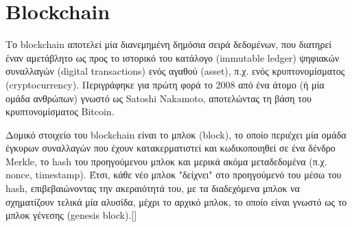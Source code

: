 \section{Blockchain}

Το blockchain αποτελεί μία διανεμημένη δημόσια σειρά δεδομένων, που διατηρεί έναν αμετάβλητο ως προς το ιστορικό του κατάλογο (immutable ledger) ψηφιακών συναλλαγών (digital transactions) ενός αγαθού (asset), π.χ. ενός κρυπτονομίσματος (cryptocurrency). Περιγράφηκε για πρώτη φορά το 2008 από ένα άτομο (ή μία ομάδα ανθρώπων) γνωστό ως Satoshi Nakamoto, αποτελώντας τη βάση του κρυπτονομίσματος Bitcoin.

Δομικό στοιχείο του blockchain είναι το μπλοκ (block), το οποίο περιέχει μία ομάδα έγκυρων συναλλαγών που έχουν κατακερματιστεί και κωδικοποιηθεί σε ένα δένδρο Merkle, το hash του προηγούμενου μπλοκ και μερικά ακόμα μεταδεδομένα (π.χ. nonce, timestamp). Έτσι, κάθε νέο μπλοκ "δείχνει" στο προηγούμενό του μέσω του hash, επιβεβαιώνοντας την ακεραιότητά του, με τα διαδεχόμενα μπλοκ να σχηματίζουν τελικά μία αλυσίδα, μέχρι το αρχικό μπλοκ, το οποίο είναι γνωστό ως το μπλοκ γένεσης (genesis block).[]

